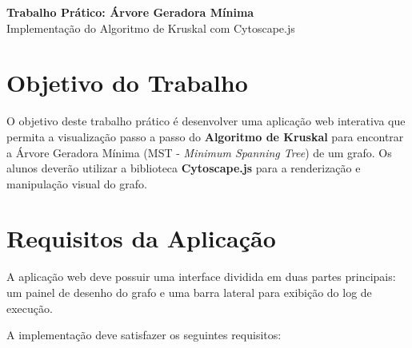 \documentclass[12pt,a4paper]{article}
\begin{document}
\begin{center}
  {\Large \textbf{Trabalho Prático: Árvore Geradora Mínima}}\\
  {\large Implementação do Algoritmo de Kruskal com Cytoscape.js}
\end{center}

\vspace{0.5cm}

\section*{Objetivo do Trabalho}

O objetivo deste trabalho prático é desenvolver uma aplicação web interativa que permita a visualização passo a passo do \textbf{Algoritmo de Kruskal} para encontrar a Árvore Geradora Mínima (MST - \textit{Minimum Spanning Tree}) de um grafo. Os alunos deverão utilizar a biblioteca \textbf{Cytoscape.js} para a renderização e manipulação visual do grafo.

\section*{Requisitos da Aplicação}

A aplicação web deve possuir uma interface dividida em duas partes principais: um painel de desenho do grafo e uma barra lateral para exibição do log de execução.

A implementação deve satisfazer os seguintes requisitos:
\end{document}
